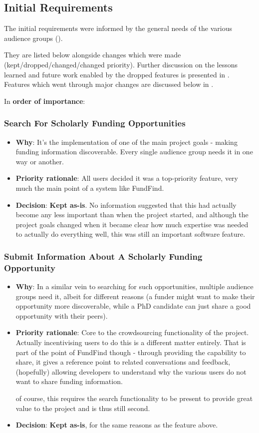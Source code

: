 \subsection{Initial Requirements}
\label{initial-reqs}
The initial requirements were informed by the general needs of the various audience groups ().

They are listed below alongside changes which were made (kept/dropped/changed/changed priority). Further discussion on the lessons learned and future work enabled by the dropped features is presented in . Features which went through major changes are discussed below in .

In \textbf{order of importance}:
\subsubsection{Search For Scholarly Funding Opportunities}
\begin{itemize}
 \item \textbf{Why}: It's the implementation of one of the main project goals - making funding information discoverable. Every single audience group needs it in one way or another.
 \item \textbf{Priority rationale}: All users decided it was a top-priority feature, very much the main point of a system like FundFind.
 \item \textbf{Decision}: \textbf{Kept as-is}. No information suggested that this had actually become any less important than when the project started, and although the project goals changed when it became clear how much expertise was needed to actually do everything well, this was still an important software feature.
\end{itemize}

\subsubsection{Submit Information About A Scholarly Funding Opportunity}
\begin{itemize}
 \item \textbf{Why}: In a similar vein to searching for such opportunities, multiple audience groups need it, albeit for different  reasons (a funder might want to make their opportunity more discoverable, while a PhD candidate can just share a good opportunity with their peers).
 \item \textbf{Priority rationale}: Core to the crowdsourcing functionality of the project. Actually incentivising users to do this is a different matter entirely. That is part of the point of FundFind though - through providing the capability to share, it gives a reference point to related conversations and feedback, (hopefully) allowing developers to understand why the various users do not want to share funding information.
 
 of course, this requires the search functionality to be present to provide great value to the project and is thus still second.
 \item \textbf{Decision}: \textbf{Kept as-is}, for the same reasons as the feature above.
 
\end{itemize}

